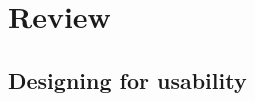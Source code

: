 \documentclass[12pt]{article}
\begin{document}

\clearpage\maketitle
\thispagestyle{empty}

\newpage

\tableofcontents %

\thispagestyle{empty}

\newpage
\pagestyle{plain}
\setcounter{page}{1}

\section{Review}
\subsection{Designing for usability}
\label{sub:designing_for_usability}
\end{document}
